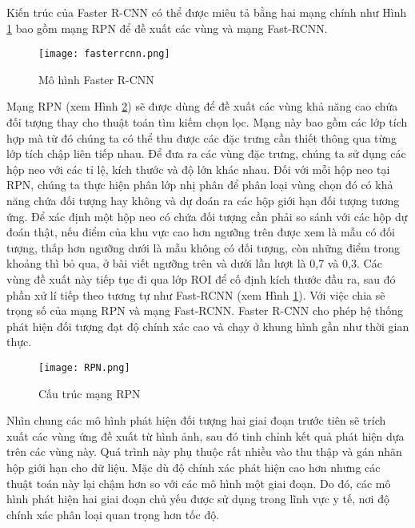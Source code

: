 \documentclass[../the.tex]{subfiles}
\begin{document}
\bigskip

{\fontsize{13}{12} \selectfont

	Kiến trúc của Faster R-CNN có thể được miêu tả bằng hai mạng chính như Hình \ref{fig:fasterrcnn} bao gồm mạng RPN để đề xuất các vùng và mạng Fast-RCNN.

}

\begin{figure}[H]
	\centering
	\texttt{[image: fasterrcnn.png]}
	\caption{Mô hình Faster R-CNN \cite{ren2016faster}}
	\label{fig:fasterrcnn}
\end{figure}

{\fontsize{13}{12} \selectfont

Mạng RPN (xem Hình \ref{fig:rpn}) sẽ được dùng để đề xuất các vùng khả năng cao chứa đối tượng thay cho thuật toán tìm kiếm chọn lọc.
Mạng này bao gồm các lớp tích hợp mà từ đó chúng ta có thể thu được các đặc trưng cần thiết thông qua từng lớp tích chập liên tiếp nhau.
Để đưa ra các vùng đặc trưng, chúng ta sử dụng các hộp neo với các tỉ lệ, kích thước và độ lớn khác nhau. Đối với mỗi hộp neo tại RPN, chúng ta thực hiện phân lớp nhị phân để phân loại vùng chọn đó có khả năng chứa đối tượng hay không và dự đoán ra các hộp giới hạn đối tượng tương ứng.
Để xác định một hộp neo có chứa đối tượng cần phải so sánh với các hộp dự đoán thật, nếu điểm của khu vực cao hơn ngưỡng trên được xem là mẫu có đối tượng, thấp hơn ngưỡng dưới là mẫu không có đối tượng, còn những điểm trong khoảng thì bỏ qua, ở bài viết ngưỡng trên và dưới lần lượt là 0,7 và 0,3.
Các vùng đề xuất này tiếp tục đi qua lớp ROI để cố định kích thước đầu ra, sau đó phần xử lí tiếp theo tương tự như Fast-RCNN (xem Hình \ref{fig:fasterrcnn}).
Với việc chia sẽ trọng số của mạng RPN và mạng Fast-RCNN. Faster R-CNN cho phép hệ thống phát hiện đối tượng đạt độ chính xác cao và chạy ở khung hình gần như thời gian thực.

}

\begin{figure}[H]
	\centering
	\texttt{[image: RPN.png]}
	\caption{Cấu trúc mạng RPN}
	\label{fig:rpn}
\end{figure}

{\fontsize{13}{12} \selectfont

Nhìn chung các mô hình phát hiện đối tượng hai giai đoạn
trước tiên sẽ trích xuất các vùng ứng đề xuất từ hình ảnh, sau đó tinh chỉnh kết quả phát hiện dựa trên các vùng này. Quá trình này phụ thuộc rất nhiều vào thu thập và gán nhãn hộp giới hạn cho dữ liệu.
Mặc dù độ chính xác phát hiện cao hơn nhưng các thuật toán này lại chậm hơn so với các mô hình một giai đoạn.
Do đó, các mô hình phát hiện hai giai đoạn chủ yếu được sử dụng trong lĩnh vực y tế, nơi độ chính xác phân loại quan trọng hơn tốc độ.

}
\end{document}
